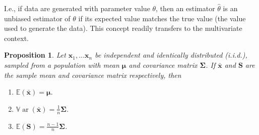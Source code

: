 \documentclass[]{book}
\newtheorem{proposition}{Proposition}[chapter]
\theoremstyle{definition}
\theoremstyle{definition}
\theoremstyle{definition}
\theoremstyle{remark}
\begin{document}
I.e., if data are generated with parameter value \(\theta\), then an estimator \(\hat{\theta}\) is an unbiased estimator of \(\theta\) if its expected value matches the true value (the value used to generate the data).
This concept readily transfers to the multivariate context.

\begin{proposition}
\protect\hypertarget{prp:unnamed-chunk-12}{}{\label{prp:unnamed-chunk-12} }Let \(\boldsymbol x_1, \ldots \boldsymbol x_n\) be independent and identically distributed (i.i.d.), sampled from a population with mean \(\boldsymbol \mu\) and covariance matrix \(\boldsymbol \Sigma\). If \(\bar{\boldsymbol x}\) and \(\boldsymbol S\) are the sample mean and covariance matrix respectively, then

\begin{enumerate}
\def\labelenumi{\arabic{enumi}.}
\item
  \({\mathbb{E}}(\bar{\boldsymbol x}) = \boldsymbol \mu\).
\item
  \({\mathbb{V}\operatorname{ar}}(\bar{\boldsymbol x}) = {\displaystyle\frac{1}{n}} \boldsymbol \Sigma\).
\item
  \({\mathbb{E}}(\boldsymbol S) = {\displaystyle\frac{n-1}{n}} \boldsymbol \Sigma\).
\end{enumerate}
\end{proposition}
\end{document}
